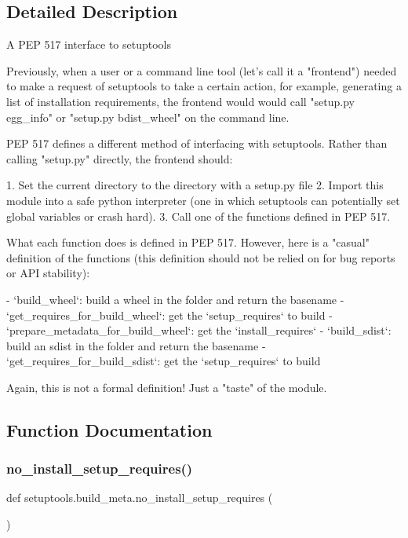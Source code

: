 \subsection{Detailed Description}
\begin{DoxyVerb}A PEP 517 interface to setuptools

Previously, when a user or a command line tool (let's call it a "frontend")
needed to make a request of setuptools to take a certain action, for
example, generating a list of installation requirements, the frontend would
would call "setup.py egg_info" or "setup.py bdist_wheel" on the command line.

PEP 517 defines a different method of interfacing with setuptools. Rather
than calling "setup.py" directly, the frontend should:

  1. Set the current directory to the directory with a setup.py file
  2. Import this module into a safe python interpreter (one in which
 setuptools can potentially set global variables or crash hard).
  3. Call one of the functions defined in PEP 517.

What each function does is defined in PEP 517. However, here is a "casual"
definition of the functions (this definition should not be relied on for
bug reports or API stability):

  - `build_wheel`: build a wheel in the folder and return the basename
  - `get_requires_for_build_wheel`: get the `setup_requires` to build
  - `prepare_metadata_for_build_wheel`: get the `install_requires`
  - `build_sdist`: build an sdist in the folder and return the basename
  - `get_requires_for_build_sdist`: get the `setup_requires` to build

Again, this is not a formal definition! Just a "taste" of the module.
\end{DoxyVerb}
 

\subsection{Function Documentation}
\mbox{\label{namespacesetuptools_1_1build__meta_a2d613b8edde1bdbe5292f18b72d07c42}} 
\subsubsection{\texorpdfstring{no\+\_\+install\+\_\+setup\+\_\+requires()}{no\_install\_setup\_requires()}}
{\footnotesize\ttfamily def setuptools.\+build\+\_\+meta.\+no\+\_\+install\+\_\+setup\+\_\+requires (\begin{DoxyParamCaption}{ }\end{DoxyParamCaption})}

